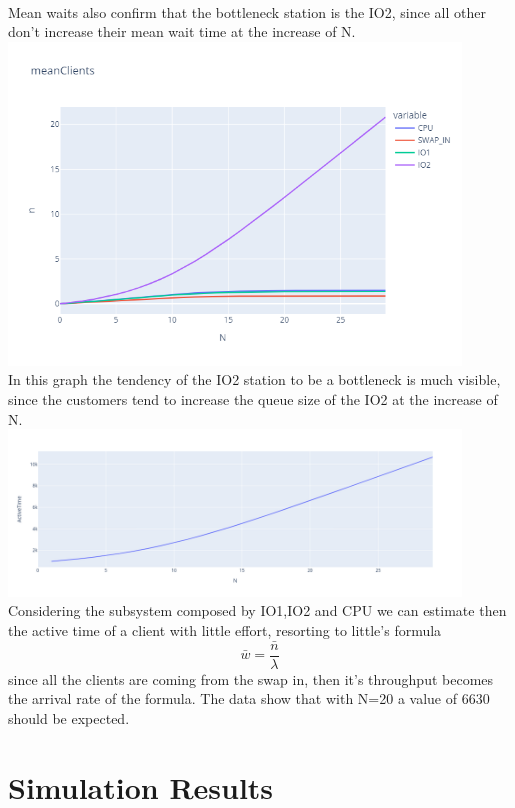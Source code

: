 \documentclass[12pt,a4paper]{article}
\begin{document}
    \\
    Mean waits also confirm that the bottleneck station is the IO2, since all other don't increase their mean wait time at the increase of N.
    \\
    \includegraphics[width=0.9\textwidth]{Images/meanClients.png}
    \\
    In this graph the tendency of the IO2 station to be a bottleneck is much visible, since the customers tend to increase the queue size of the IO2 at the increase of N.
    \\
    \includegraphics[width=0.9\textwidth]{Images/ActiveTimes.png}
    \\
    Considering the subsystem composed by IO1,IO2 and CPU we can estimate then the active time of a client with little effort, resorting to little's formula 
    $$
    \bar{w}= \frac{\bar{n}}{\lambda}
    $$
    since all the clients are coming from the swap in, then it's throughput becomes the arrival rate of the formula. The data show that with N=20 a value of 6630 should be expected.
    \section*{Simulation Results}
    
    
\end{document}
